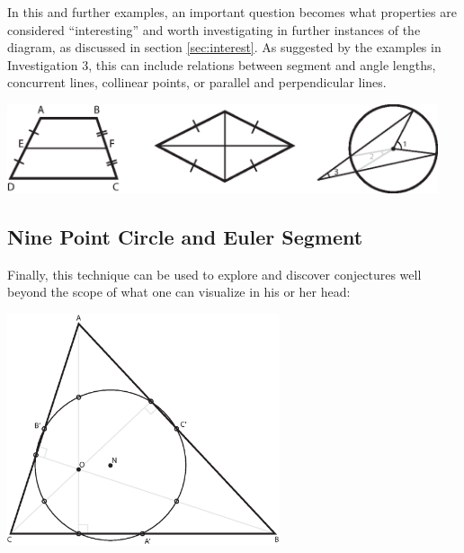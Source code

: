 In this and further examples, an important question becomes what
properties are considered ``interesting'' and worth investigating in
further instances of the diagram, as discussed in section
\ref{sec:interest}.  As suggested by the examples in Investigation 3,
this can include relations between segment and angle lengths,
concurrent lines, collinear points, or parallel and perpendicular
lines.

\begin{center}
\includegraphics[width=0.95\textwidth]{diagrams/extra-diagrams.eps}
\end{center}


\subsection{Nine Point Circle and Euler Segment}

Finally, this technique can be used to explore and discover
conjectures well beyond the scope of what one can visualize in his or
her head:

\begin{center}
\includegraphics[width=0.6\textwidth]{diagrams/nine-point.eps}
\end{center}


